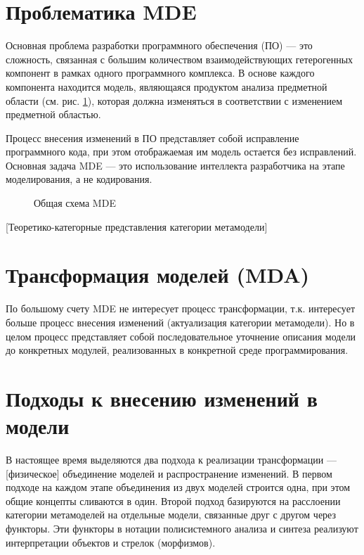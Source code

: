 \documentclass[12pt,a4paper]{extarticle}
\begin{document}
\section{Проблематика MDE}
\label{sec:problem-mde}

Основная проблема разработки программного обеспечения (ПО) --- это сложность,
связанная с большим количеством взаимодействующих гетерогенных компонент в
рамках одного программного комплекса.  В основе каждого компонента находится
модель, являющаяся продуктом анализа предметной области (см. рис.
\ref{fig:mde-gen-schema}), которая должна изменяться в соответствии с изменением
предметной областью.

Процесс внесения изменений в ПО представляет собой исправление программного
кода, при этом отображаемая им модель остается без исправлений.  Основная задача
MDE --- это использование интеллекта разработчика на этапе моделирования, а не
кодирования.

\begin{figure}[htbp]
  \centering
%  
  \caption{Общая схема MDE}
  \label{fig:mde-gen-schema}
\end{figure}

[Теоретико-категорные представления категории метамодели]

\section{Трансформация моделей (MDA)}
\label{sec:mda-transform}

По большому счету MDE не интересует процесс трансформации, т.к. интересует
больше процесс внесения изменений (актуализация категории метамодели).  Но в
целом процесс представляет собой последовательное уточнение описания модели до
конкретных модулей, реализованных в конкретной среде программирования.

\section{Подходы к внесению изменений в модели}
\label{sec:mde-conversions}

В настоящее время выделяются два подхода к реализации трансформации ---
[физическое] объединение моделей и распространение изменений.  В первом подходе
на каждом этапе объединения из двух моделей строится одна, при этом общие
концепты сливаются в один.  Второй подход базируются на расслоении категории
метамоделей на отдельные модели, связанные друг с другом через функторы.  Эти
функторы в нотации полисистемного анализа и синтеза реализуют интерпретации
объектов и стрелок (морфизмов).
\end{document}
